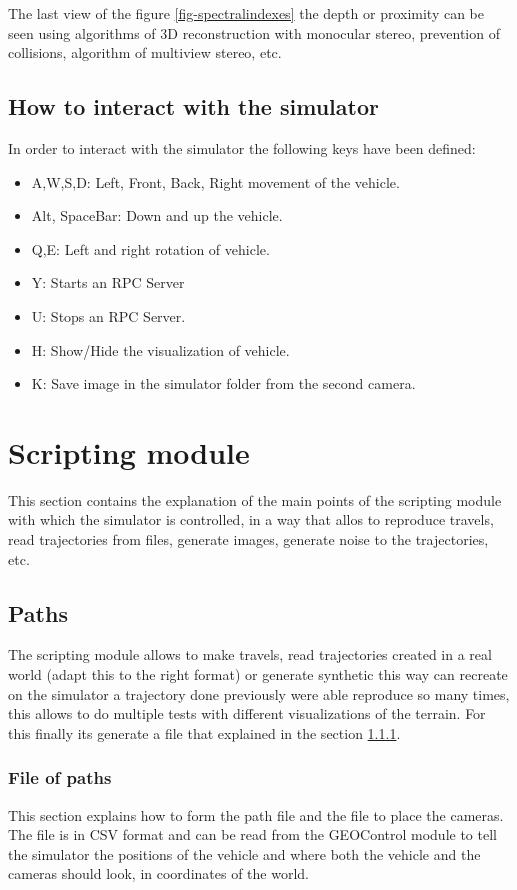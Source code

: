 \documentclass[10pt,a4paper,twocolumn,twoside]{article}
\begin{document}
The last view of the figure \ref{fig-spectralindexes} the depth or proximity can be seen using  algorithms of 3D reconstruction with monocular stereo, prevention of collisions, algorithm of multiview stereo, etc.

\subsection{How to interact with the simulator}
In order to interact with the simulator the following keys have been defined:

\begin{itemize}
\setlength\itemsep{0em}
\item A,W,S,D: Left, Front, Back, Right movement of the vehicle.
\item Alt, SpaceBar: Down and up the vehicle.
\item Q,E: Left and right rotation of vehicle.
\item Y: Starts an RPC Server
\item U: Stops an RPC Server.
\item H: Show/Hide the visualization of vehicle.
\item K: Save image in the simulator folder from the second camera.
\end{itemize}

\section{Scripting module}
\label{modulescript}

This section contains the explanation of the main points of the scripting module with which the simulator is controlled, in a way that allos to reproduce travels, read trajectories from files, generate images, generate noise to the trajectories, etc.

\subsection{Paths}
The scripting module allows to make travels, read trajectories created in a real world (adapt this to the right format) or generate synthetic this way can recreate on the simulator a trajectory done previously were able reproduce so many times, this allows to do multiple tests with different visualizations of the terrain. For this finally its generate a file that explained in the section \ref{file-trajectories}.

\subsubsection{File of paths}
\label{file-trajectories}
This section explains how to form the path file and the file to place the cameras. The file is in CSV format and can be read from the GEOControl module to tell the simulator the positions of the vehicle and where both the vehicle and the cameras should look, in coordinates of the world.
\end{document}
